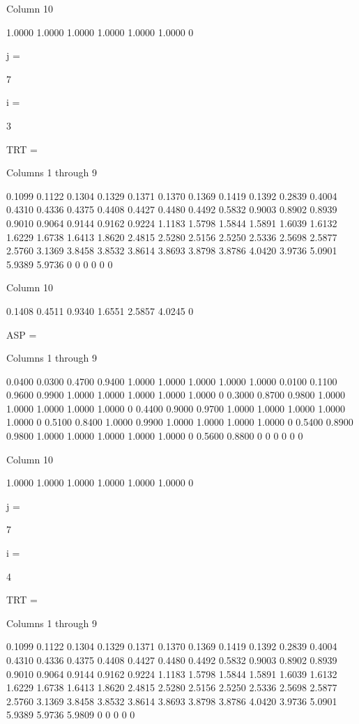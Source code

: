   Column 10

    1.0000
    1.0000
    1.0000
    1.0000
    1.0000
    1.0000
         0


j =

     7


i =

     3


TRT =

  Columns 1 through 9

    0.1099    0.1122    0.1304    0.1329    0.1371    0.1370    0.1369    0.1419    0.1392
    0.2839    0.4004    0.4310    0.4336    0.4375    0.4408    0.4427    0.4480    0.4492
    0.5832    0.9003    0.8902    0.8939    0.9010    0.9064    0.9144    0.9162    0.9224
    1.1183    1.5798    1.5844    1.5891    1.6039    1.6132    1.6229    1.6738    1.6413
    1.8620    2.4815    2.5280    2.5156    2.5250    2.5336    2.5698    2.5877    2.5760
    3.1369    3.8458    3.8532    3.8614    3.8693    3.8798    3.8786    4.0420    3.9736
    5.0901    5.9389    5.9736         0         0         0         0         0         0

  Column 10

    0.1408
    0.4511
    0.9340
    1.6551
    2.5857
    4.0245
         0


ASP =

  Columns 1 through 9

    0.0400    0.0300    0.4700    0.9400    1.0000    1.0000    1.0000    1.0000    1.0000
    0.0100    0.1100    0.9600    0.9900    1.0000    1.0000    1.0000    1.0000    1.0000
         0    0.3000    0.8700    0.9800    1.0000    1.0000    1.0000    1.0000    1.0000
         0    0.4400    0.9000    0.9700    1.0000    1.0000    1.0000    1.0000    1.0000
         0    0.5100    0.8400    1.0000    0.9900    1.0000    1.0000    1.0000    1.0000
         0    0.5400    0.8900    0.9800    1.0000    1.0000    1.0000    1.0000    1.0000
         0    0.5600    0.8800         0         0         0         0         0         0

  Column 10

    1.0000
    1.0000
    1.0000
    1.0000
    1.0000
    1.0000
         0


j =

     7


i =

     4


TRT =

  Columns 1 through 9

    0.1099    0.1122    0.1304    0.1329    0.1371    0.1370    0.1369    0.1419    0.1392
    0.2839    0.4004    0.4310    0.4336    0.4375    0.4408    0.4427    0.4480    0.4492
    0.5832    0.9003    0.8902    0.8939    0.9010    0.9064    0.9144    0.9162    0.9224
    1.1183    1.5798    1.5844    1.5891    1.6039    1.6132    1.6229    1.6738    1.6413
    1.8620    2.4815    2.5280    2.5156    2.5250    2.5336    2.5698    2.5877    2.5760
    3.1369    3.8458    3.8532    3.8614    3.8693    3.8798    3.8786    4.0420    3.9736
    5.0901    5.9389    5.9736    5.9809         0         0         0         0         0

